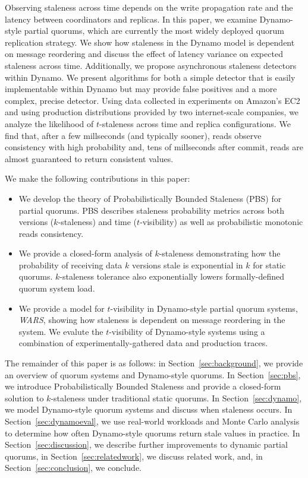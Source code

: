 \documentclass{vldb}
\begin{document}
Observing staleness across time depends on the write propagation rate
and the latency between coordinators and replicas.  In this paper, we
examine Dynamo-style partial quorums, which are currently the most
widely deployed quorum replication strategy.  We show how staleness in
the Dynamo model is dependent on message reordering and discuss the
effect of latency variance on expected staleness across time.
Additionally, we propose asynchronous staleness detectors within
Dynamo.  We present algorithms for both a simple detector that is
easily implementable within Dynamo but may provide false positives and
a more complex, precise detector.  Using data collected in experiments
on Amazon's EC2 and using production distributions provided by two
internet-scale companies, we analyze the likelihood of $t$-staleness
across time and replica configurations.  We find that, after a few
millseconds (and typically sooner), reads observe consistency with
high probability and, tens of millseconds after commit, reads are
almost guaranteed to return consistent values.

We make the following contributions in this paper:

\begin{itemize}

\item We develop the theory of Probabilistically Bounded Staleness
  (PBS) for partial quorums. PBS describes staleness probability
  metrics across both versions ($k$-staleness) and time
  ($t$-visibility) as well as probabilistic monotonic reads
  consistency.

\item We provide a closed-form analysis of $k$-staleness demonstrating
  how the probability of receiving data $k$ versions stale is
  exponential in $k$ for static quorums.  $k$-staleness tolerance also
  exponentially lowers formally-defined quorum system load.

\item We provide a model for $t$-visibility in
  Dynamo-style partial quorum systems, \textit{WARS},  showing how
  staleness is dependent on message reordering in the system.  We
  evalute the $t$-visibility of Dynamo-style systems using a
  combination of experimentally-gathered data and production traces.

\end{itemize}

The remainder of this paper is as follows: in
Section~\ref{sec:background}, we provide an overview of quorum systems
and Dynamo-style quorums.  In Section~\ref{sec:pbs}, we introduce
Probabilistically Bounded Staleness and provide a closed-form solution
to $k$-staleness under traditional static quorums.  In
Section~\ref{sec:dynamo}, we model Dynamo-style quorum systems and
discuss when staleness occurs.  In Section~\ref{sec:dynamoeval}, we
use real-world workloads and Monte Carlo analysis to determine how
often Dynamo-style quorums return stale values in practice.  In
Section~\ref{sec:discussion}, we describe further improvements to
dynamic partial quorums, in Section~\ref{sec:relatedwork}, we discuss
related work, and, in Section~\ref{sec:conclusion}, we conclude.
\end{document}
